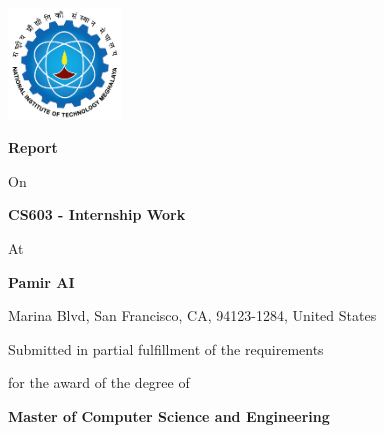 \documentclass[12pt,a4paper]{report}
\begin{document}

\begin{titlepage}
    \centering

    \vspace*{1cm}

    \includegraphics[width=3cm]{nitm_logo.png}

    \vspace{1.5cm}

    {\LARGE\bfseries Report}

    \vspace{1cm}

    {\Large On}

    \vspace{0.5cm}

    {\LARGE\bfseries CS603 - Internship Work}

    \vspace{1cm}

    {\Large At}

    \vspace{0.5cm}

    {\LARGE\bfseries Pamir AI}

    \vspace{0.3cm}

    {\large Marina Blvd, San Francisco, CA, 94123-1284, United States}

    \vspace{1.5cm}

    {\large Submitted in partial fulfillment of the requirements}

    {\large for the award of the degree of}

    \vspace{0.5cm}

    {\Large\bfseries Master of Computer Science and Engineering}

    \vspace{1cm}


\end{titlepage}
\end{document}
